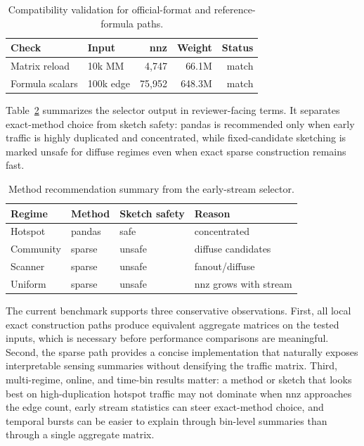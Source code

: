 \documentclass[conference]{IEEEtran}
\begin{document}
\begin{table}[t]
\centering
\caption{Compatibility validation for official-format and reference-formula paths.}
\label{tab:reference}
\begin{tabular}{llrrr}
\toprule
Check & Input & nnz & Weight & Status \\
\midrule
Matrix reload & 10k MM & 4,747 & 66.1M & match \\
Formula scalars & 100k edge & 75,952 & 648.3M & match \\
\bottomrule
\end{tabular}
\end{table}

Table~\ref{tab:methodsummary} summarizes the selector output in reviewer-facing terms. It separates exact-method choice from sketch safety: pandas is recommended only when early traffic is highly duplicated and concentrated, while fixed-candidate sketching is marked unsafe for diffuse regimes even when exact sparse construction remains fast.

\begin{table}[t]
\centering
\caption{Method recommendation summary from the early-stream selector.}
\label{tab:methodsummary}
\begin{tabular}{llll}
\toprule
Regime & Method & Sketch safety & Reason \\
\midrule
Hotspot & pandas & safe & concentrated \\
Community & sparse & unsafe & diffuse candidates \\
Scanner & sparse & unsafe & fanout/diffuse \\
Uniform & sparse & unsafe & nnz grows with stream \\
\bottomrule
\end{tabular}
\end{table}

The current benchmark supports three conservative observations. First, all local exact construction paths produce equivalent aggregate matrices on the tested inputs, which is necessary before performance comparisons are meaningful. Second, the sparse path provides a concise implementation that naturally exposes interpretable sensing summaries without densifying the traffic matrix. Third, multi-regime, online, and time-bin results matter: a method or sketch that looks best on high-duplication hotspot traffic may not dominate when nnz approaches the edge count, early stream statistics can steer exact-method choice, and temporal bursts can be easier to explain through bin-level summaries than through a single aggregate matrix.
\end{document}
